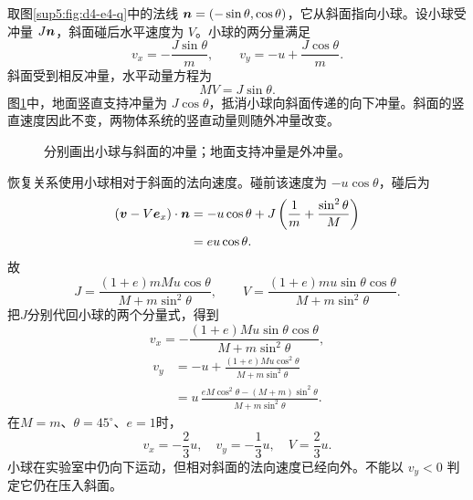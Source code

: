\begin{solution}
取图\ref{sup5:fig:d4-e4-q}中的法线 $\bm{n}=(-\sin\theta,\cos\theta)$，它从斜面指向小球。设小球受冲量 $J\bm{n}$，斜面碰后水平速度为 $V$。小球的两分量满足
\begin{equation}
 v_x=-\frac{J\sin\theta}{m},\qquad
 v_y=-u+\frac{J\cos\theta}{m}.
\end{equation}
斜面受到相反冲量，水平动量方程为
\begin{equation}
 MV=J\sin\theta.
\end{equation}
图\ref{sup5:fig:d4-e4-s}中，地面竖直支持冲量为 $J\cos\theta$，抵消小球向斜面传递的向下冲量。斜面的竖直速度因此不变，两物体系统的竖直动量则随外冲量改变。

\begin{figure}[H]\centering
{}
\caption{分别画出小球与斜面的冲量；地面支持冲量是外冲量。}\label{sup5:fig:d4-e4-s}
\end{figure}
恢复关系使用小球相对于斜面的法向速度。碰前该速度为 $-u\cos\theta$，碰后为
\begin{align}
 (\bm{v}-V\bm{e}_x)\cdot\bm{n}
 &=-u\cos\theta+J\left(\frac1m+\frac{\sin^2\theta}{M}\right)\\
 &=eu\cos\theta.
\end{align}
故
\begin{equation}
 J=\frac{(1+e)mM u\cos\theta}{M+m\sin^2\theta},\qquad
 V=\frac{(1+e)m u\sin\theta\cos\theta}{M+m\sin^2\theta}.
\end{equation}
把$J$分别代回小球的两个分量式，得到
\[
v_x=-\frac{(1+e)M u\sin\theta\cos\theta}{M+m\sin^2\theta},
\]
\[
\begin{aligned}
v_y&=-u+\frac{(1+e)M u\cos^2\theta}{M+m\sin^2\theta}\\
&=u\,\frac{eM\cos^2\theta-(M+m)\sin^2\theta}{M+m\sin^2\theta}.
\end{aligned}
\]
在$M=m$、$\theta=45^\circ$、$e=1$时，
\begin{equation}
 v_x=-\frac23u,\quad v_y=-\frac13u,\quad V=\frac23u.
\end{equation}
小球在实验室中仍向下运动，但相对斜面的法向速度已经向外。不能以 $v_y<0$ 判定它仍在压入斜面。


\end{solution}
